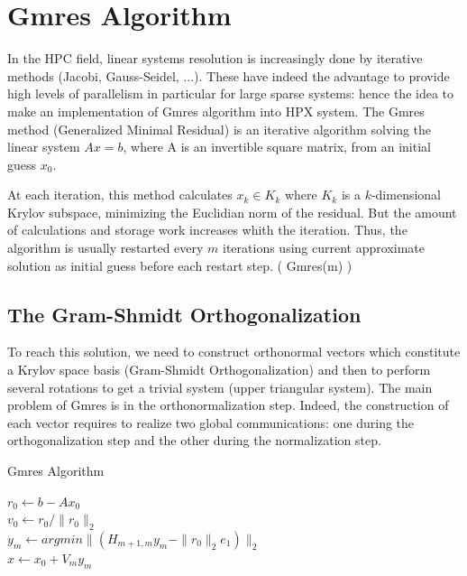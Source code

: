 \documentclass[smallextended]{svjour3}
\begin{document}
\section{Gmres Algorithm}\label{Gmres}
In the HPC field, linear systems resolution is increasingly done by iterative methods \cite{Methodes} (Jacobi, Gauss-Seidel, ...). These have indeed the advantage to provide high levels of parallelism in particular for large sparse systems: hence the idea to make an implementation of Gmres algorithm into HPX system. The Gmres method (Generalized Minimal Residual) \cite{GMRES} is an iterative algorithm solving the linear system $Ax=b$, where A is an invertible square matrix, from an initial guess $x_{0}$.\smallskip

At each iteration, this method calculates $x_{k} \in K_{k}$ where $K_{k}$ is a $k$-dimensional Krylov subspace, minimizing the Euclidian norm of the residual. But the amount of calculations and storage work increases whith the iteration. Thus, the algorithm is usually restarted every $m$ iterations using current approximate solution as initial guess before each restart step. ( Gmres(m) ) \cite{GMRES}

\subsection{The Gram-Shmidt Orthogonalization}
To reach this solution, we need to construct orthonormal vectors which constitute a Krylov space basis (Gram-Shmidt Orthogonalization) and then to perform several rotations to get a trivial system (upper triangular system). The main problem of Gmres is in the orthonormalization step. Indeed, the construction of each vector requires to realize two global communications: one during the orthogonalization step and the other during the normalization step.

\begin{algorithm}
\caption{Gmres Algorithm}
$r_0 \gets b-Ax_0$\\  
$v_0 \gets r_0/\|r_0\|_2$\\ 
  $y_m \gets argmin\|(H_{m+1,m}y_m - \|r_0\|_2e_1)\|_2$\\
  $x \gets x_0 + V_my_m$
\end{algorithm}
\end{document}
